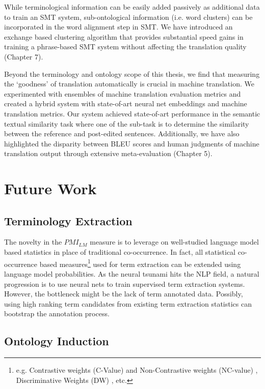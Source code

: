 While terminological information can be easily added passively as additional data to train an SMT system, sub-ontological information (i.e. word clusters) can be incorporated in the word alignment step in SMT. We have introduced an exchange based clustering algorithm that provides substantial speed gains in training a phrase-based SMT system without affecting the translation quality (Chapter 7). 

Beyond the terminology and ontology scope of this thesis, we find that measuring the `goodness' of translation automatically is crucial in machine translation. We experimented with ensembles of machine translation evaluation metrics and created a hybrid system with state-of-art neural net embeddings and machine translation metrics. Our system achieved state-of-art performance in the semantic textual similarity task where one of the sub-task is to determine the similarity between the reference and post-edited sentences. Additionally, we have also highlighted the disparity between BLEU scores and human judgments of machine translation output through extensive meta-evaluation (Chapter 5). 

\section{Future Work}

\subsection{Terminology Extraction}

The novelty in the $PMI_{LM}$ measure is to leverage on well-studied language model based statistics in place of traditional co-occurrence. In fact, all statistical co-occurrence based measures\footnote{e.g. Contrastive weights (C-Value) and Non-Contrastive weights (NC-value) \citep{frantzi1998c}, Discriminative Weights (DW) \citep{bonin2010contrastive,enkhsaikhan2007measuring}, etc.}  used for term extraction can be extended using language model probabilities. As the neural tsunami \citep{manning2016computational} hits the NLP field, a natural progression is to use neural nets to train supervised term extraction systems. However, the bottleneck might be the lack of term annotated data. Possibly, using high ranking term candidates from existing term extraction statistics can bootstrap the annotation process. 

\subsection{Ontology Induction}

